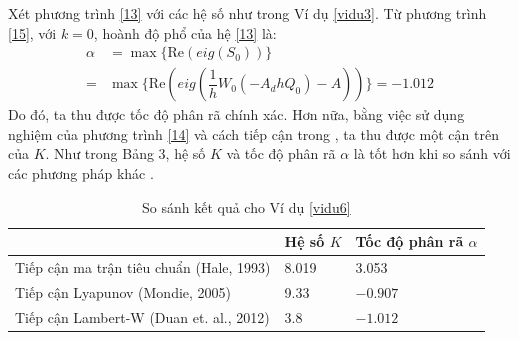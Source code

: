 \begin{vd}\label{vidu6}
	Xét phương trình \eqref{13} với các hệ số như trong Ví dụ \ref{vidu3}. Từ phương trình \eqref{15}, với $k = 0$, hoành độ phổ của hệ \eqref{13} là:
	\begin{align*}
	\alpha&=\max\{\mathrm{Re}(eig(S_0))\}\\
	=&\max\{\mathrm{Re}(eig(\dfrac{1}{h}W_0(-A_dhQ_0)-A))\}=-1.012
	\end{align*}
	Do đó, ta thu được tốc độ phân rã chính xác. Hơn nữa, bằng việc sử dụng nghiệm của phương trình \eqref{14} và cách tiếp cận trong \cite{Du12}, ta thu được một cận trên của $K$. Như trong Bảng 3, hệ số $K$ và tốc độ phân rã $\alpha$ là tốt hơn khi so sánh với các phương pháp khác \cite{Du12}.
	
	\begin{table}[!h]
		\centering
		\begin{tabular}{lll}
			\hline 
			& Hệ số $K$ & Tốc độ phân rã $\alpha$ \\ 
			\hline 
			Tiếp cận ma trận tiêu chuẩn (Hale, 1993) & 8.019 & 3.053 \\ 
			
			Tiếp cận Lyapunov (Mondie, 2005) & 9.33 & $-0.907$ \\ 
			
			Tiếp cận Lambert-W (Duan et. al., 2012) & 3.8 & $-1.012$ \\ 
			\hline 
		\end{tabular} 
		\caption{So sánh kết quả cho Ví dụ \ref{vidu6}}
	\end{table}
\end{vd}


 
